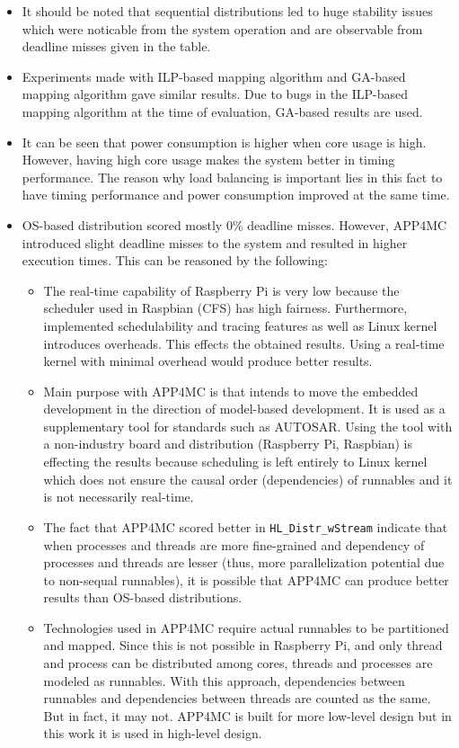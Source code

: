 \begin{itemize}
	\item It should be noted that sequential distributions led to huge stability issues which were noticable from the system operation and are observable from deadline misses given in the table.
	\item Experiments made with ILP-based mapping algorithm and GA-based mapping algorithm gave similar results. Due to bugs in the ILP-based mapping algorithm at the time of evaluation, GA-based results are used.
	\item It can be seen that power consumption is higher when core usage is high. However, having high core usage makes the system better in timing performance. The reason why load balancing is important lies in this fact to have timing performance and power consumption improved at the same time.
	\item OS-based distribution scored mostly 0\% deadline misses. However, APP4MC introduced slight deadline misses to the system and resulted in higher execution times. This can be reasoned by the following:
	\begin{itemize}
		\item The real-time capability of Raspberry Pi is very low because the scheduler used in Raspbian (CFS) has high fairness. Furthermore, implemented schedulability and tracing features as well as Linux kernel introduces overheads. This effects the  obtained results. Using a real-time kernel with minimal overhead would produce better results.
		\item Main purpose with APP4MC is that intends to move the embedded development in the direction of model-based development. It is used as a supplementary tool for standards such as AUTOSAR. Using the tool with a non-industry board and distribution (Raspberry Pi, Raspbian) is effecting the results because scheduling is left entirely to Linux kernel which does not ensure the causal order (dependencies) of runnables and it is not necessarily real-time.
		\item The fact that APP4MC scored better in \texttt{HL{\_}Distr{\_}wStream} indicate that when processes and threads are more fine-grained and dependency of processes and threads are lesser (thus, more parallelization potential due to non-sequal runnables), it is possible that APP4MC can produce better results than OS-based distributions.
		\item Technologies used in APP4MC require actual runnables to be partitioned and mapped. Since this is not possible in Raspberry Pi, and only thread and process can be distributed among cores, threads and processes are modeled as runnables. With this approach, dependencies between runnables and dependencies between threads are counted as the same. But in fact, it may not. APP4MC is built for more low-level design but in this work it is used in high-level design.

\end{itemize}
\end{itemize}
